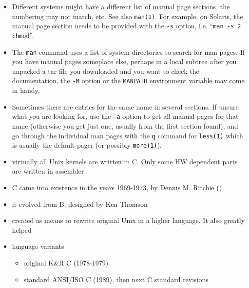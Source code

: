\begin{itemize}
\item Different systems might have a different list of manual page sections, the
numbering may not match, etc.  See also \texttt{man(1)}.  For example, on
Solaris, the manual page section needs to be provided with the \texttt{-s}
option, i.e. ``\texttt{man -s 2 chmod}''.
\item The \texttt{man} command uses a list of system directories to search for
man pages.  If you have manual pages someplace else, perhaps in a local subtree
after you unpacked a tar file you downloaded and you want to check the
documentation, the \texttt{-M} option or the \texttt{MANPATH} environment
variable may come in handy.
\item Sometimes there are entries for the same name in several sections.  If
unsure what you are looking for, use the \texttt{-a} option to get all manual
pages for that name (otherwise you get just one, usually from the first
section found), and go through the individual man pages with the \texttt{q}
command for \texttt{less(1)} which is usually the default pager (or possibly
\texttt{more(1)}).
\end{itemize}


\begin{slide}
\begin{itemize}
\item virtually all Unix kernels are written in C. Only some HW dependent parts
are written in assembler.
\item C came into existence in the years 1969-1973, by Dennis M. Ritchie ()
\item it evolved from B, designed by Ken Thomson
\item created as means to rewrite original Unix in a higher language.  It also
greatly helped 
\item language variants
    \begin{itemize}
    \item original K\&R C (1978-1979)
    \item standard ANSI/ISO C (1989), then next C standard revisions
    \end{itemize}
\end{itemize}
\end{slide}


